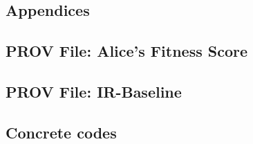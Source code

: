 \newcommand{\multipdf}[4][]{
	\label{sec:#2}
	
	
}

\newcommand{\singlepdf}[3]{
	
}

\begin{appendices}
	\stopcontents[sections]
	\chapter*{Appendices}
	\startcontents[appendix]
	\renewcommand{\thesection}{\appendixname~\Alph{section}}

	\singlepdf{Provenance Primer}{prov_primer}{pdfs/provenance-primer.pdf}

	\multipdf{Interview Questionnaire}{interview_questionnaire}{pdfs/questionnaire.pdf}

	\multipdf{Participant Information Sheet}{information_sheet}{pdfs/infosheet.pdf}

	\section{PROV File: Alice's Fitness Score}
	\label{sec:prov_file_fitness_score}
	
	

	\clearpage

	\section{PROV File: IR-Baseline}
	\label{sec:prov_file_ir_baseline}
	
	

	\section{Concrete codes}
	\label{sec:concrete_codes}


\end{appendices}
